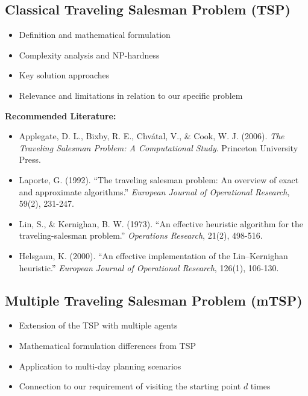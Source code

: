 \subsection{Classical Traveling Salesman Problem (TSP)}
\begin{itemize}
    \item Definition and mathematical formulation
    \item Complexity analysis and NP-hardness
    \item Key solution approaches
    \item Relevance and limitations in relation to our specific problem
\end{itemize}

\noindent\textbf{Recommended Literature:}
\begin{itemize}
    \item Applegate, D. L., Bixby, R. E., Chvátal, V., \& Cook, W. J. (2006). \textit{The Traveling Salesman Problem: A Computational Study}. Princeton University Press.
    \item Laporte, G. (1992). ``The traveling salesman problem: An overview of exact and approximate algorithms.'' \textit{European Journal of Operational Research}, 59(2), 231-247.
    \item Lin, S., \& Kernighan, B. W. (1973). ``An effective heuristic algorithm for the traveling-salesman problem.'' \textit{Operations Research}, 21(2), 498-516.
    \item Helsgaun, K. (2000). ``An effective implementation of the Lin–Kernighan heuristic.'' \textit{European Journal of Operational Research}, 126(1), 106-130.
\end{itemize}

\subsection{Multiple Traveling Salesman Problem (mTSP)}
\begin{itemize}
    \item Extension of the TSP with multiple agents
    \item Mathematical formulation differences from TSP
    \item Application to multi-day planning scenarios
    \item Connection to our requirement of visiting the starting point $d$ times
\end{itemize}

